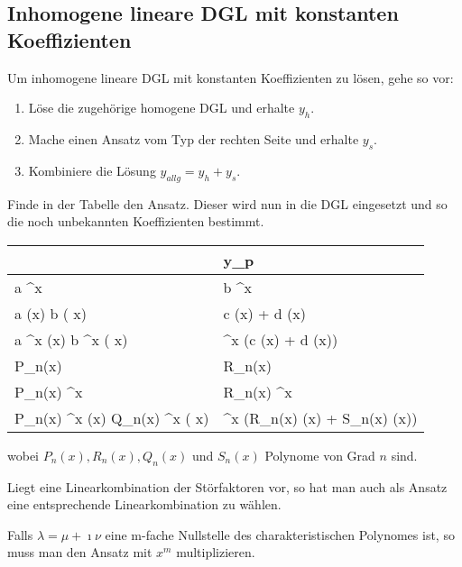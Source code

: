 		\subsection{Inhomogene lineare DGL mit konstanten Koeffizienten}
			\begin{proofhelp}
				Um inhomogene lineare DGL mit konstanten Koeffizienten zu lösen, gehe so vor:
				\begin{enumerate}
					\item Löse die zugehörige homogene DGL und erhalte $y_{h}$.
					\item Mache einen Ansatz vom Typ der rechten Seite und erhalte $y_{s}$.
					\item Kombiniere die Lösung $y_{allg} = y_{h} + y_{s}$.
				\end{enumerate}
			\end{proofhelp}
			\begin{hint}
				Finde in der Tabelle den Ansatz. Dieser wird nun in die DGL eingesetzt und so die noch unbekannten Koeffizienten bestimmt.			
			\end{hint}
			\begin{center}
				\begin{tabular}{|C{5cm}|C{8cm}|}
					\hline
																																	&	y_p														\tabularnewline\hline
					a \cdot \emath^{\mu x}																											&	b \cdot \emath^{\mu x}														\tabularnewline\hline
					a \cdot \sin	 (\nu x)		\linebreak		\fracsize b \cdot \cos ( \nu x)															&	c \cdot \sin (\nu x) + d \cdot \cos (\nu x)									\tabularnewline\hline
					a \cdot \emath^{\mu x} \cdot \sin	 (\nu x)		\linebreak		\fracsize b \cdot \emath^{\mu x} \cdot \cos ( \nu x)				&	\emath^{\mu x} \cdot (c \cdot \sin (\nu x) + d \cdot \cos (\nu x))			\tabularnewline\hline
					P_n(x)																															&	R_n(x)																		\tabularnewline\hline
					P_n(x) \emath^{\mu x} 																											&	R_n(x) \emath^{\mu x}														\tabularnewline\hline
					P_n(x) \cdot \emath^{\mu x} \cdot \sin	 (\nu x)		\linebreak		\fracsize Q_n(x) \cdot \emath^{\mu x} \cdot \cos ( \nu x)		&	\emath^{\mu x} \cdot (R_n(x) \cdot \sin (\nu x) + S_n(x) \cdot \cos (\nu x))	\tabularnewline\hline
				\end{tabular}
			\end{center}
			wobei $P_n(x), R_n(x), Q_n(x)$ und $S_n(x)$ Polynome von Grad $n$ sind.\\[1em]
			\begin{hint}
				Liegt eine Linearkombination der Störfaktoren vor, so hat man auch als Ansatz eine entsprechende Linearkombination zu wählen.
			\end{hint}
			\begin{hint}
				Falls $\lambda = \mu + \imath \nu$ eine m-fache Nullstelle des charakteristischen Polynomes ist, so muss man den Ansatz mit $x^m$ multiplizieren.
			\end{hint}
